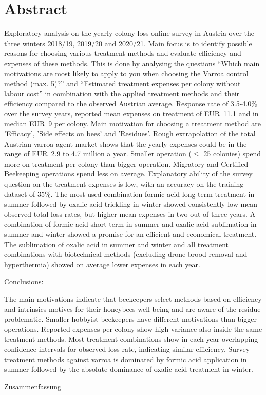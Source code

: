 \chapter*{Abstract}
\label{sec:abstract}
\vspace*{-10mm}

Exploratory analysis on the yearly colony loss online survey in Austria over the three winters 2018/19, 2019/20 and 2020/21. Main focus is to identify possible reasons for choosing various treatment methods and evaluate efficiency and expenses of these methods. This is done by analysing the questions \enquote{Which main motivations are most likely to apply to you when choosing the Varroa control method (max. 5)?} and \enquote{Estimated treatment expenses per colony without labour cost} in combination with the applied treatment methods and their efficiency compared to the observed Austrian average. Response rate of 3.5-4.0\% over the survey years, reported mean expenses on treatment of EUR~11.1 and in median EUR~9 per colony. Main motivation for choosing a treatment method are 'Efficacy', 'Side effects on bees' and 'Residues'. Rough extrapolation of the total Austrian varroa agent market shows that the yearly expenses could be in the range of EUR~2.9 to 4.7 million a year. Smaller operation ($\leq$ 25 colonies) spend more on treatment per colony than bigger operation. Migratory and Certified Beekeeping operations spend less on average. Explanatory ability of the survey question on the treatment expenses is low, with an accuracy on the training dataset of 35\%. The most used combination formic acid long term treatment in summer followed by oxalic acid trickling in winter showed consistently low mean observed total loss rates, but higher mean expenses in two out of three years. A combination of formic acid short term in summer and oxalic acid sublimation in summer and winter showed a promise for an efficient and economical treatment. The sublimation of oxalic acid in summer and winter and all treatment combinations with biotechnical methods (excluding drone brood removal and hyperthermia) showed on average lower expenses in each year.

Conclusions:

The main motivations indicate that beekeepers select methods based on efficiency and intrinsics motives for their honeybees well being and are aware of the residue problematic. Smaller hobbyist beekeepers have different motivations than bigger operations. Reported expenses per colony show high variance also inside the same treatment methods. Most treatment combinations show in each year overlapping confidence intervals for observed loss rate, indicating similar efficiency. Survey treatment methods against varroa is dominated by formic acid application in summer followed by the absolute dominance of oxalic acid treatment in winter.

\vspace*{20mm}

{Zusammenfassung}
\label{sec:Zusammenfassung}